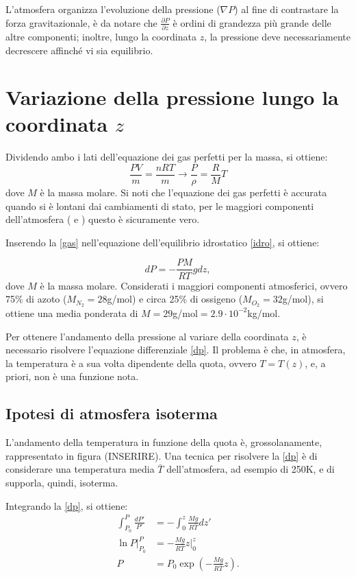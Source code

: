 L'atmosfera organizza l'evoluzione della pressione ($\nabla P$) al fine di contrastare la forza gravitazionale, è da notare che $\frac{\partial P}{\partial z}$ è ordini di grandezza più grande delle altre componenti; inoltre, lungo la coordinata $z$, la pressione deve necessariamente decrescere affinché vi sia equilibrio. 

\section{Variazione della pressione lungo la coordinata $z$}
Dividendo ambo i lati dell'equazione dei gas perfetti per la massa, si ottiene:
\begin{equation}\label{gas}
	\frac{PV}{m}=\frac{n RT}{m} \rightarrow \frac{P}{\rho}=\frac{R}{M}T
\end{equation}
dove $M$ è la massa molare. Si noti che l'equazione dei gas perfetti è accurata quando si è lontani dai cambiamenti di stato, per le maggiori componenti dell'atmosfera ( e ) questo è sicuramente vero. 

Inserendo la \eqref{gas} nell'equazione dell'equilibrio idrostatico \eqref{idro}, si ottiene:

\begin{equation}\label{dp}
	dP=-\frac{PM}{RT}g dz,
\end{equation}
dove $M$ è la massa molare. Considerati i maggiori componenti atmosferici, ovvero 75\% di azoto ($M_{N_2}=28$g/mol) e circa 25\% di ossigeno ($M_{O_2}=32$g/mol), si ottiene una media ponderata di $M=29$g/mol$=2.9\cdot10^{-2}$kg/mol.

Per ottenere l'andamento della pressione al variare della coordinata $z$, è necessario risolvere l'equazione differenziale \eqref{dp}. Il problema è che, in atmosfera, la temperatura è a sua volta dipendente della quota, ovvero $T=T(z)$, e, a priori, non è una funzione nota.\\


\subsection{Ipotesi di atmosfera isoterma}
L'andamento della temperatura in funzione della quota è, grossolanamente, rappresentato in figura (INSERIRE). Una tecnica per risolvere la \eqref{dp} è di considerare una temperatura media $\bar{T}$ dell'atmosfera, ad esempio di 250K, e di supporla, quindi, isoterma. 

Integrando la \eqref{dp}, si ottiene: 
\begin{align}
	\int_{P_0}^{P}\frac{dP'}{P'}&=-\int_{0}^{z}\frac{Mg}{R\bar{T}}dz'\\
	\ln P \Big|_{P_0}^P&=-\frac{Mg}{R\bar{T}}z\Big|_0^z\\
	P&=P_0\exp\left(-\frac{Mg}{R\bar{T}}z\right) \label{pz}.
\end{align}

